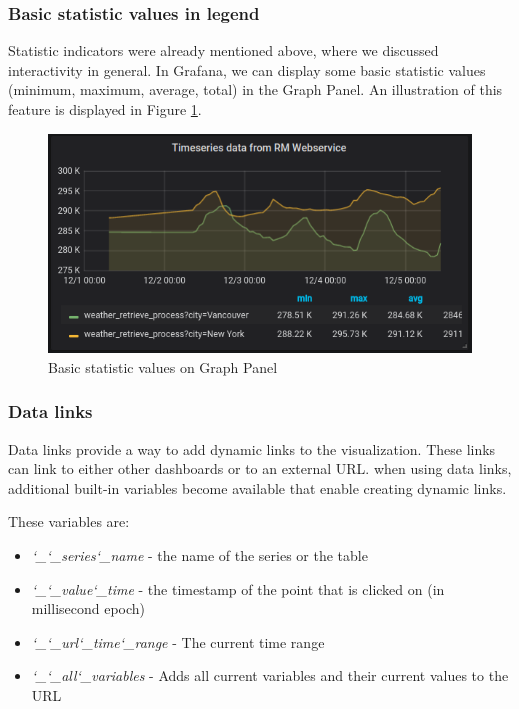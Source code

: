 \subsubsection{Basic statistic values in legend}

Statistic indicators were already mentioned above, where we discussed interactivity in general. In Grafana, we can display some basic statistic values (minimum, maximum, average, total) in the Graph Panel. An illustration of this feature is displayed in Figure \ref{fig:basic-statistics}.

\begin{figure}[H]
	\centering
	\includegraphics[width=130mm, keepaspectratio]{figures/basic-statistics.png}
	\caption{Basic statistic values on Graph Panel}
	\label{fig:basic-statistics}
\end{figure}

\subsubsection{Data links}

Data links provide a way to add dynamic links to the visualization. These links can link to either other dashboards or to an external URL. when using data links, additional built-in variables become available that enable creating dynamic links.

These variables are:
\begin{itemize}
	\item \emph{\char`_\char`_series\char`_name} - the name of the series or the table
	\item \emph{\char`_\char`_value\char`_time} - the timestamp of the point that is clicked on (in millisecond epoch)
	\item \emph{\char`_\char`_url\char`_time\char`_range} - The current time range
	\item \emph{\char`_\char`_all\char`_variables} - Adds all current variables and their current values to the URL
\end{itemize}

